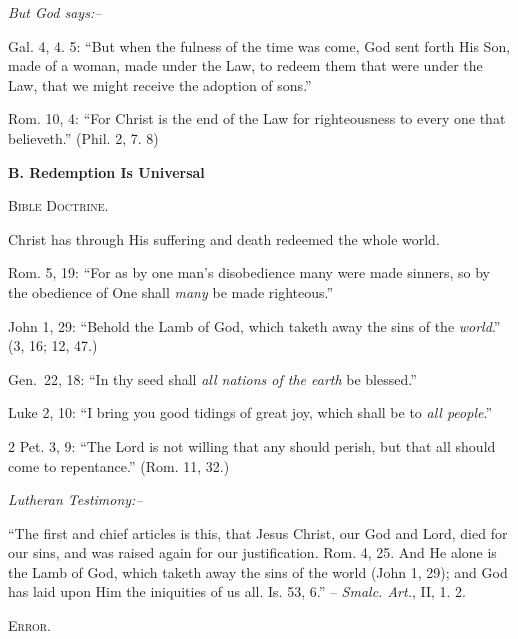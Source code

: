 \documentclass[
]{book}
\begin{document}
\begin{center}
\textsl{But God says:--}
\end{center}

Gal. 4, 4. 5: ``But when the fulness of the time was come, God sent forth His Son, made of a woman, made under the Law, to redeem them that were under the Law, that we might receive the adoption of sons.''

Rom. 10, 4: ``For Christ is the end of the Law for righteousness to every one that believeth.'' (Phil. 2, 7. 8)

\begin{center}
\textbf{B.  Redemption Is Universal}

\textsc{Bible Doctrine.}
\end{center}

Christ has through His suffering and death redeemed the whole world.

Rom. 5, 19: ``For as by one man's disobedience many were made sinners, so by the obedience of One shall \emph{many} be made righteous.''

John 1, 29: ``Behold the Lamb of God, which taketh away the sins of the \emph{world}.'' (3, 16; 12, 47.)

Gen.~22, 18: ``In thy seed shall \emph{all nations of the earth} be blessed.''

Luke 2, 10: ``I bring you good tidings of great joy, which shall be to \emph{all people}.''

2 Pet. 3, 9: ``The Lord is not willing that any should perish, but that all should come to repentance.'' (Rom. 11, 32.)

\begin{center}
\textsl{Lutheran Testimony:--}
\end{center}

``The first and chief articles is this, that Jesus Christ, our God and Lord, died for our sins, and was raised again for our justification. Rom. 4, 25. And He alone is the Lamb of God, which taketh away the sins of the world (John 1, 29); and God has laid upon Him the iniquities of us all. Is. 53, 6.'' -- \emph{Smalc. Art.}, II, 1. 2.

\begin{center}
\textsc{Error.}
\end{center}
\end{document}
